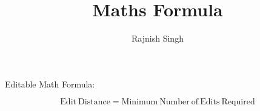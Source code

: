 \documentclass{article}
\title{Maths Formula}
\author{Rajnish Singh}
\begin{document}
        \maketitle

        Editable Math Formula:

        \[
        {\mathrm{Edit~Distance}}={\mathrm{Minimum~Number~of~Edits~Required}}
        \]

        
\end{document}
